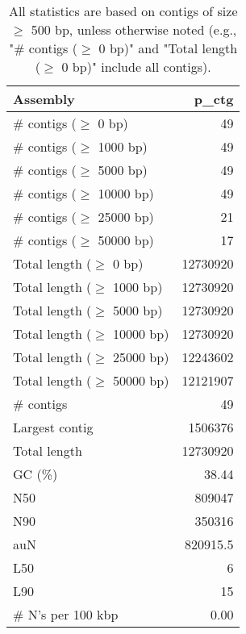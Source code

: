 \documentclass[12pt,a4paper]{article}
\begin{document}
\begin{table}[ht]
\begin{center}
\caption{All statistics are based on contigs of size $\geq$ 500 bp, unless otherwise noted (e.g., "\# contigs ($\geq$ 0 bp)" and "Total length ($\geq$ 0 bp)" include all contigs).}
\begin{tabular}{|l*{1}{|r}|}
\hline
Assembly & p\_ctg \\ \hline
\# contigs ($\geq$ 0 bp) & 49 \\ \hline
\# contigs ($\geq$ 1000 bp) & 49 \\ \hline
\# contigs ($\geq$ 5000 bp) & 49 \\ \hline
\# contigs ($\geq$ 10000 bp) & 49 \\ \hline
\# contigs ($\geq$ 25000 bp) & 21 \\ \hline
\# contigs ($\geq$ 50000 bp) & 17 \\ \hline
Total length ($\geq$ 0 bp) & 12730920 \\ \hline
Total length ($\geq$ 1000 bp) & 12730920 \\ \hline
Total length ($\geq$ 5000 bp) & 12730920 \\ \hline
Total length ($\geq$ 10000 bp) & 12730920 \\ \hline
Total length ($\geq$ 25000 bp) & 12243602 \\ \hline
Total length ($\geq$ 50000 bp) & 12121907 \\ \hline
\# contigs & 49 \\ \hline
Largest contig & 1506376 \\ \hline
Total length & 12730920 \\ \hline
GC (\%) & 38.44 \\ \hline
N50 & 809047 \\ \hline
N90 & 350316 \\ \hline
auN & 820915.5 \\ \hline
L50 & 6 \\ \hline
L90 & 15 \\ \hline
\# N's per 100 kbp & 0.00 \\ \hline
\end{tabular}
\end{center}
\end{table}
\end{document}
